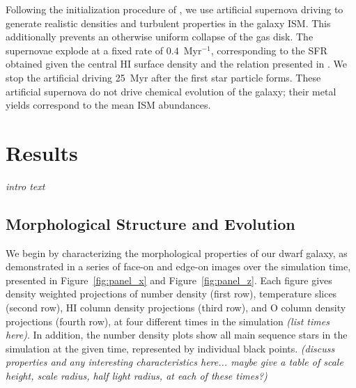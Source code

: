 \documentclass[twocolumn]{aastex61}
\begin{document}
Following the initialization procedure of \cite{Hu2017}, we use artificial supernova driving to generate realistic densities and turbulent properties in the galaxy ISM. This additionally prevents an otherwise uniform collapse of the gas disk. The supernovae explode at a fixed rate of $0.4$~Myr$^{-1}$, corresponding to the SFR obtained given the central HI surface density and the relation presented in \citep{Roychowdhury2009}. We stop the artificial driving 25~Myr after the first star particle forms. These artificial supernova do not drive chemical evolution of the galaxy; their metal yields correspond to the mean ISM abundances. 

\section{Results}
\label{sec:results}
\textit{intro text}

\subsection{Morphological Structure and Evolution}
\label{sec:structure}

We begin by characterizing the morphological properties of our dwarf galaxy, as demonstrated in a series of face-on and edge-on images over the simulation time, presented in Figure~\ref{fig:panel_x} and Figure~\ref{fig:panel_z}. Each figure gives density weighted projections of number density (first row), temperature slices (second row), HI column density projections (third row), and O column density projections (fourth row), at four different times in the simulation \textit{(list times here)}. In addition, the number density plots show all main sequence stars in the simulation at the given time, represented by individual black points. \textit{(discuss properties and any interesting characteristics here... maybe give a table of scale height, scale radius, half light radius, at each of these times?)}
\end{document}
